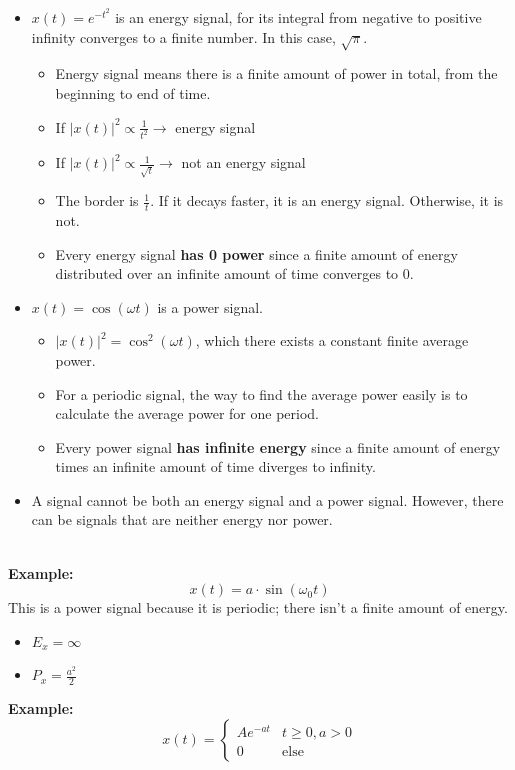 \documentclass[10pt]{article}
\newcommand{\example}{\textbf{Example: }}
\begin{document}
\begin{itemize}
    \item $x(t) = e^{-t^2}$ is an energy signal, for its integral from negative to positive infinity converges to a finite number.  In this case, $\sqrt{\pi}$.
    \begin{itemize}
        \item Energy signal means there is a finite amount of power in total, from the beginning to end of time.
        \item If $\vert x(t) \vert^2 \propto \frac{1}{t^2} \rightarrow$ energy signal
        \item If $\vert x(t) \vert^2 \propto \frac{1}{\sqrt{t}} \rightarrow$ not an energy signal
        \item The border is $\frac{1}{t}$.  If it decays faster, it is an energy signal.  Otherwise, it is not.
        \item Every energy signal \textbf{has 0 power} since a finite amount of energy distributed over an infinite amount of time converges to 0.
    \end{itemize}
    \item $x(t) = \cos(\omega t)$ is a power signal.
    \begin{itemize}
        \item $\vert x(t)\vert^2 = \cos^2(\omega t)$, which there exists a constant finite average power.
        \item For a periodic signal, the way to find the average power easily is to calculate the average power for one period.
        \item Every power signal \textbf{has infinite energy} since a finite amount of energy times an infinite amount of time diverges to infinity.
    \end{itemize}
    \item A signal cannot be both an energy signal and a power signal.  However, there can be signals that are neither energy nor power.
\end{itemize}
~\\
\example
\[x(t) = a \cdot \sin(\omega_0 t)\]
This is a power signal because it is periodic; there isn't a finite amount of energy.
\begin{itemize}
    \item $E_x = \infty$
    \item $P_x = \frac{a^2}{2}$
\end{itemize}
\example
\[x(t) = \begin{cases} Ae^{-at} & t \geq 0, a > 0 \\ 0 & \text{else}\end{cases}\]
\end{document}

